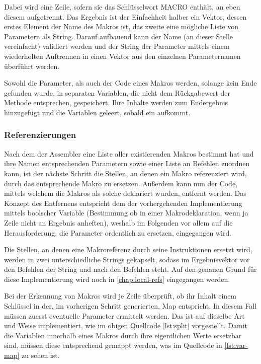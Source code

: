 Dabei wird eine Zeile, sofern sie das Schlüsselwort \glqq MACRO\grqq{} enthält, an eben diesem aufgetrennt. Das Ergebnis ist der Einfachheit halber ein Vektor, dessen erstes Element der Name des Makros ist, das zweite eine mögliche Liste von Parametern als String. Darauf aufbauend kann der Name (an dieser Stelle vereinfacht) validiert werden und der String der Parameter mittels einem wiederholten Auftrennen in einen Vektor aus den einzelnen Parameternamen überführt werden.

Sowohl die Parameter, als auch der Code eines Makros werden, solange kein Ende gefunden wurde, in separaten Variablen, die nicht dem Rückgabewert der Methode entsprechen, gespeichert. Ihre Inhalte werden zum Endergebnis hinzugefügt und die Variablen geleert, sobald ein  aufkommt.

\subsubsection{Referenzierungen}\label{chap:macro:references}

Nach dem der Assembler eine Liste aller existierenden Makros bestimmt hat und ihre Namen entsprechenden Parametern sowie einer Liste an Befehlen zuordnen kann, ist der nächste Schritt die Stellen, an denen ein Makro referenziert wird, durch das entsprechende Makro zu ersetzen. Außerdem kann nun der Code, mittels welchem die Makros als solche deklariert wurden, entfernt werden. Das Konzept des Entfernens entspricht dem der vorhergehenden Implementierung mittels boolscher Variable (Bestimmung ob in einer Makrodeklaration, wenn ja Zeile nicht an Ergebnis anheften), weshalb im Folgenden vor allem auf die Herausforderung, die Parameter ordentlich zu ersetzen, eingegangen wird.

Die Stellen, an denen eine Makroreferenz durch seine Instruktionen ersetzt wird, werden in zwei unterschiedliche Strings gekapselt, sodass im Ergebnisvektor vor den Befehlen der String  und nach den Befehlen  steht. Auf den genauen Grund für diese Implementierung wird noch in \ref{chap:local-refs} eingegangen werden.

Bei der Erkennung von Makros wird je Zeile überprüft, ob ihr Inhalt einem Schlüssel in der, im vorherigen Schritt generierten, Map entspricht. In diesem Fall müssen zuerst eventuelle Parameter ermittelt werden. Das ist auf dieselbe Art und Weise implementiert, wie im obigen Quellcode \ref{lst:split} vorgestellt. Damit die Variablen innerhalb eines Makros durch ihre eigentlichen Werte ersetzbar sind, müssen diese entsprechend gemappt werden, was im Quellcode in \ref{lst:var-map} zu sehen ist.

